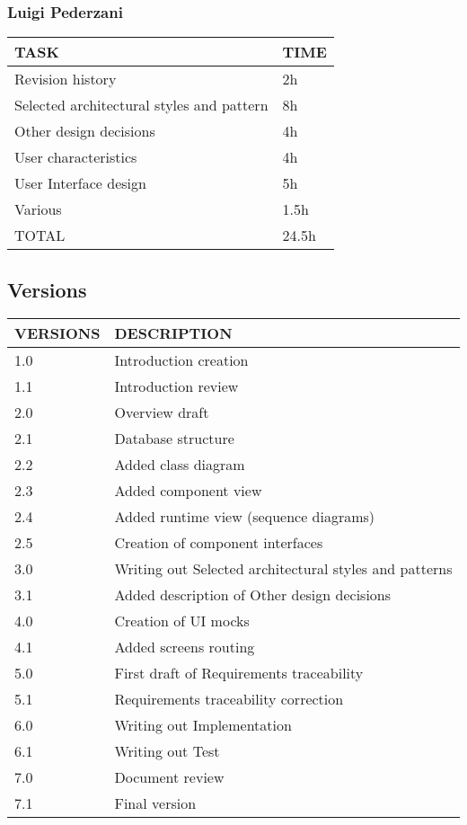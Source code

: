 \subsubsection{Luigi Pederzani}
\hfill
\begin{center}
	\begin{tabular}{ | l | p{6cm} | } 
		\hline
		TASK & TIME \\ 
		\hline
		Revision history & 2h  \\ 
		\hline
		Selected architectural styles and pattern & 8h  \\ 
		\hline
		Other design decisions  & 4h \\ 
		\hline
		User characteristics & 4h \\ 
		\hline
		User Interface design & 5h \\ 
		\hline
		Various & 1.5h  \\ 
		\hline
		TOTAL & 24.5h \\ 
		\hline
	\end{tabular}
\end{center}


\newpage
\subsection{Versions}
\hfill
\hfill
\begin{center}
	\begin{tabular}{ | l | p{6cm} | } 
		\hline
		VERSIONS & DESCRIPTION  \\ 
		\hline
		1.0 & Introduction creation   \\ 
		\hline
		1.1 & Introduction review  \\ 
		\hline
		2.0 & Overview draft \\ 
		\hline
		2.1 & Database structure \\ 
		\hline
		2.2 & Added class diagram \\ 
		\hline
		2.3 & Added component view   \\ 
		\hline
		2.4 & Added runtime view (sequence diagrams)  \\ 
		\hline
		2.5 & Creation of component interfaces \\ 
		\hline
		3.0 & Writing out Selected architectural styles and patterns \\ 
		\hline
		3.1 & Added description of Other design decisions \\ 
		\hline
		4.0 & Creation of UI mocks  \\ 
		\hline
		4.1 & Added screens routing \\ 
		\hline
		5.0 & First draft of Requirements traceability \\ 
		\hline
		5.1 & Requirements traceability correction \\ 
		\hline
		6.0 & Writing out Implementation \\ 
		\hline
		6.1 & Writing out Test \\ 
		\hline
		7.0 & Document review \\ 
		\hline
		7.1 & Final version \\ 
		\hline
	\end{tabular}
\end{center}


